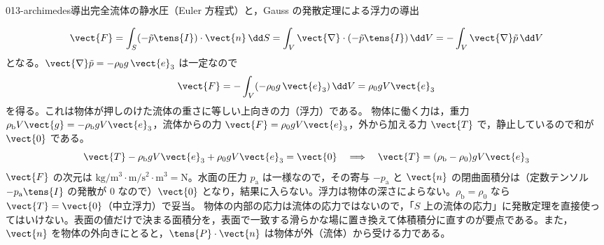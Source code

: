 \documentclass[uplatex,dvipdfmx,a4paper,11pt]{jsarticle}
\begin{document}
\begin{mondai}{013-archimedes}{導出}{完全流体の静水圧（Euler 方程式）と，Gauss の発散定理による浮力の導出}
\begin{tadashii}
\[ \vect{F}=\int_S(-\tilde{p}\tens{I})\cdot\vect{n}\,\dd S=\int_V\vect{\nabla}\cdot(-\tilde{p}\tens{I})\,\dd V=-\int_V\vect{\nabla}\tilde{p}\,\dd V \]
となる。$\vect{\nabla}\tilde{p}=-\rho_0g\,\vect{e}_3$ は一定なので
\[ \vect{F}=-\int_V(-\rho_0g\,\vect{e}_3)\,\dd V=\rho_0gV\vect{e}_3 \]
を得る。これは物体が押しのけた流体の重さに等しい上向きの力（浮力）である。
 物体に働く力は，重力 $\rho_{\mathrm{b}}V\vect{g}=-\rho_{\mathrm{b}}gV\vect{e}_3$，流体からの力 $\vect{F}=\rho_0gV\vect{e}_3$，外から加える力 $\vect{T}$ で，静止しているので和が $\vect{0}$ である。
\[ \vect{T}-\rho_{\mathrm{b}}gV\vect{e}_3+\rho_0gV\vect{e}_3=\vect{0}\quad\Longrightarrow\quad\vect{T}=(\rho_{\mathrm{b}}-\rho_0)gV\vect{e}_3 \]
\kenzan $\vect{F}$ の次元は $\unit{\kilogram\per\metre\cubed}\cdot\unit{\metre\per\second\squared}\cdot\unit{\metre\cubed}=\unit{\newton}$。水面の圧力 $p_{\mathrm{a}}$ は一様なので，その寄与 $-p_{\mathrm{a}}$ と $\vect{n}$ の閉曲面積分は（定数テンソル $-p_{\mathrm{a}}\tens{I}$ の発散が $0$ なので）$\vect{0}$ となり，結果に入らない。浮力は物体の深さによらない。$\rho_{\mathrm{b}}=\rho_0$ なら $\vect{T}=\vect{0}$（中立浮力）で妥当。
\tsumazuki 物体の内部の応力は流体の応力ではないので，「$S$ 上の流体の応力」に発散定理を直接使ってはいけない。表面の値だけで決まる面積分を，表面で一致する滑らかな場に置き換えて体積積分に直すのが要点である。また，$\vect{n}$ を物体の外向きにとると，$\tens{P}\cdot\vect{n}$ は物体が外（流体）から受ける力である。
\end{tadashii}
\end{mondai}
\end{document}
